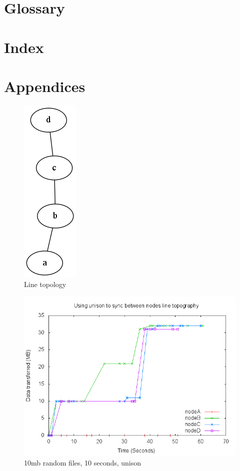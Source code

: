 \documentclass[12pt]{article}
\begin{document}
\section{Glossary}

\section{Index}

\section{Appendices}

\begin{figure}[htp]
    \centering
    \includegraphics[scale=0.5]{images/line-graph.png}
    \caption{Line topology}
    \label{fig:line_graph}
\end{figure}

\begin{figure}[htp]
    \centering
    \includegraphics[scale=0.5]{images/line-uni.png}
    \caption{10mb random files, 10 seconds, unison}
    \label{fig:line_uni_graph}
\end{figure}
\end{document}
